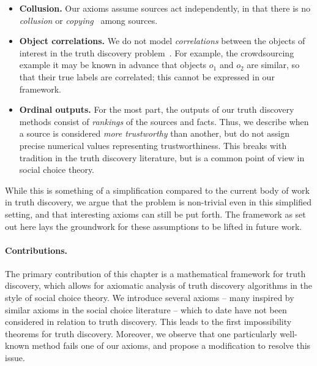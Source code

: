 \begin{itemize}

    \item \textbf{Collusion.} Our axioms assume sources act independently, in
        that there is no \emph{collusion} or
        \emph{copying}~\cite{dong_truth_2009} among sources.

    \item \textbf{Object correlations.} We do not model \emph{correlations}
          between the objects of interest in the truth discovery
          problem~\cite{yang_probabilistic_2019}. For example, the
          crowdsourcing example it may be known in advance that objects $o_1$
          and $o_2$ are similar, so that their true labels are correlated; this
          cannot be expressed in our framework.

    \item \textbf{Ordinal outputs.} For the most part, the outputs of our truth
          discovery methods consist of \emph{rankings} of the sources and
          facts. Thus, we describe when a source is considered \emph{more
          trustworthy} than another, but do not assign precise numerical values
          representing trustworthiness. This breaks with tradition in the truth
          discovery literature, but is a common point of view in social choice
          theory.
\end{itemize}

While this is something of a simplification compared to the current body of
work in truth discovery, we argue that the problem is non-trivial even in this
simplified setting, and that interesting axioms can still be put forth. The
framework as set out here lays the groundwork for these assumptions to be
lifted in future work.

\paragraph{Contributions.}

The primary contribution of this chapter is a mathematical framework for truth
discovery, which allows for axiomatic analysis of truth discovery algorithms in
the style of social choice theory. We introduce several axioms -- many inspired
by similar axioms in the social choice literature -- which to date have not
been considered in relation to truth discovery. This leads to the first
impossibility theorems for truth discovery. Moreover, we observe that one
particularly well-known method fails one of our axioms, and
propose a modification to resolve this issue.

